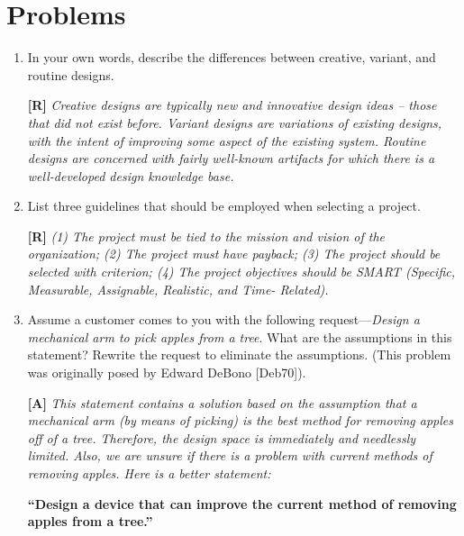 \section{Problems}
\label{section:projectSelectionProblems}
\graphicspath{ {./chapter02/FigSolutions} }

\begin{enumerate}
\def\labelenumi{\arabic{enumi}.}
\item
  In your own words, describe the differences between creative, variant,
  and routine designs.
  
 \begin{onlysolution}
 \textbf{[R]}
 \itshape
 Creative designs are typically new and innovative design ideas -- those
that did not exist before. Variant designs are variations of existing
designs, with the intent of improving some aspect of the existing
system. Routine designs are concerned with fairly well-known artifacts
for which there is a well-developed design knowledge base.
  \end{onlysolution}
  
\item
  List three guidelines that should be employed when selecting a
  project.
  
 \begin{onlysolution}
 \textbf{[R]}
 \itshape
 (1) The project must be tied to the mission and vision of the
organization; (2) The project must have payback; (3) The project should
be selected with criterion; (4) The project objectives should be SMART
(Specific, Measurable, Assignable, Realistic, and Time-
Related).
 \end{onlysolution}
  
  
\item
  Assume a customer comes to you with the following
  request---\emph{Design a mechanical arm to pick apples from a tree}.
  What are the assumptions in this statement? Rewrite the request to
  eliminate the assumptions. (This problem was originally posed by
  Edward DeBono {[}Deb70{]}).

  \begin{onlysolution}
  \textbf{[A]}
  \itshape
  This statement contains a solution based on the assumption that a 
  mechanical arm (by means of picking) is the best method for removing 
  apples off of a tree. Therefore, the design space is immediately and 
  needlessly limited. Also, we are unsure if there is a problem with 
  current methods of removing apples. Here is a better statement:
  
  \textbf{“Design a device that can improve the current method of removing apples from a tree.”}
  

\end{onlysolution}
\end{enumerate}
